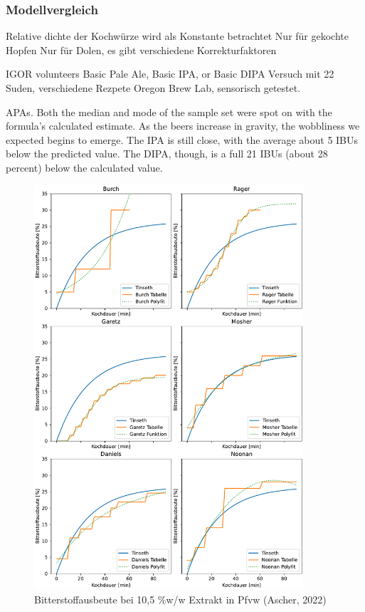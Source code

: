 \documentclass[a4paper,parskip=half]{scrartcl}
\begin{document}
\subsubsection*{Modellvergleich}

\parencite[61]{Beechum2017}
Relative dichte der Kochwürze wird als Konstante betrachtet
Nur für gekochte Hopfen
Nur für Dolen, es gibt verschiedene Korrekturfaktoren

IGOR volunteers Basic Pale Ale, Basic IPA, or
Basic DIPA 
Versuch mit 22 Suden, verschiedene Rezpete
Oregon Brew Lab, sensorisch getestet.


\parencite[62]{Beechum2017}

APAs. Both the median and mode of the
sample set were spot on with the formula’s
calculated estimate. As the beers increase
in gravity, the wobbliness we expected
begins to emerge. The IPA is still close,
with the average about 5 IBUs below the
predicted value. The DIPA, though, is a
full 21 IBUs (about 28 percent) below the
calculated value.


\begin{figure}[H]
\centering
\includegraphics[width=10cm]{graph_utilization.pdf}
\caption{Bitterstoffausbeute bei 10,5 \%w/w Extrakt in Pfvw (Ascher, 2022)}
\label{fig:utilcompare}
\end{figure}
\end{document}
